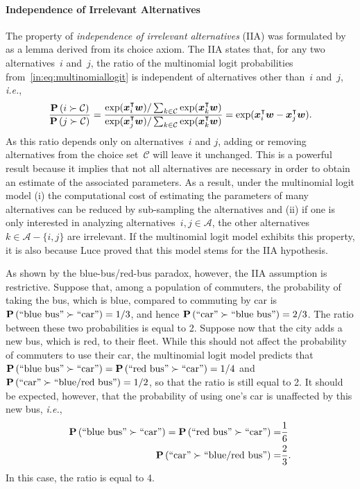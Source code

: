\paragraph{Independence of Irrelevant Alternatives}

The property of \emph{independence of irrelevant alternatives} (IIA) was formulated by~\citet{luce1959individual} as a lemma derived from its choice axiom.
The IIA states that, for any two alternatives~$i$ and~$j$, the ratio of the multinomial logit probabilities from~\eqref{in:eq:multinomiallogit} is independent of alternatives other than~$i$ and~$j$, \textit{i.e.},
\begin{equation}
	\frac{\mathbf{P}\left( i \succ \mathcal{C} \right)}{\mathbf{P}\left( j \succ \mathcal{C} \right)}
	= \frac{\exp(\bm{x}_i^\intercal \bm{w}) / \sum_{k \in \mathcal{C}} \exp(\bm{x}_k^\intercal \bm{w})}{\exp(\bm{x}_j^\intercal \bm{w}) / \sum_{k \in \mathcal{C}} \exp(\bm{x}_k^\intercal \bm{w})}
	= \exp(\bm{x}_i^\intercal \bm{w} - \bm{x}_j^\intercal \bm{w}).
\end{equation}
As this ratio depends only on alternatives~$i$ and $j$, adding or removing alternatives from the choice set~$\mathcal{C}$ will leave it unchanged.
This is a powerful result because it implies that not all alternatives are necessary in order to obtain an estimate of the associated parameters.
As a result, under the multinomial logit model (i) the computational cost of estimating the parameters of many alternatives can be reduced by sub-sampling the alternatives and (ii) if one is only interested in analyzing alternatives~$i,j \in \mathcal{A}$, the other alternatives~$k \in \mathcal{A} - \{i, j\}$ are irrelevant.
If the multinomial logit model exhibits this property, it is also because Luce proved that this model stems for the IIA hypothesis.

As shown by the blue-bus/red-bus paradox, however, the IIA assumption is restrictive.
Suppose that, among a population of commuters, the probability of taking the bus, which is blue, compared to commuting by car is $\mathbf{P}\left( \text{``blue bus''} \succ \text{``car''} \right) = 1/3$, and hence $\mathbf{P}\left( \text{``car''} \succ \text{``blue bus''} \right) = 2/3$.
The ratio between these two probabilities is equal to 2.
Suppose now that the city adds a new bus, which is red, to their fleet.
While this should not affect the probability of commuters to use their car, the multinomial logit model predicts that $\mathbf{P}\left( \text{``blue bus''} \succ \text{``car''} \right) = \mathbf{P}\left( \text{``red bus''} \succ \text{``car''} \right) = 1/4$ and $\mathbf{P}\left( \text{``car''} \succ \text{``blue/red bus''} \right) = 1/2$, so that the ratio is still equal to 2.
It should be expected, however, that the probability of using one's car is unaffected by this new bus, \textit{i.e.},
\begin{align*}
	\mathbf{P}\left( \text{``blue bus''} \succ \text{``car''} \right) =  \mathbf{P}\left( \text{``red bus''} \succ \text{``car''} \right) = & \frac{1}{6}  \\
	\mathbf{P}\left( \text{``car''} \succ \text{``blue/red bus''} \right) =                                               & \frac{2}{3}.
\end{align*}
In this case, the ratio is equal to 4.

